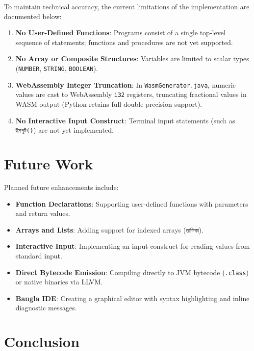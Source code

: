 \documentclass[12pt, a4paper]{report}
\begin{document}
To maintain technical accuracy, the current limitations of the implementation are documented below:
\begin{enumerate}
    \item \textbf{No User-Defined Functions}: Programs consist of a single top-level sequence of statements; functions and procedures are not yet supported.
    \item \textbf{No Array or Composite Structures}: Variables are limited to scalar types (\texttt{NUMBER}, \texttt{STRING}, \texttt{BOOLEAN}).
    \item \textbf{WebAssembly Integer Truncation}: In \texttt{WasmGenerator.java}, numeric values are cast to WebAssembly \texttt{i32} registers, truncating fractional values in WASM output (Python retains full double-precision support).
    \item \textbf{No Interactive Input Construct}: Terminal input statements (such as \texttt{ইনপুট()}) are not yet implemented.
\end{enumerate}

\chapter{Future Work}

Planned future enhancements include:
\begin{itemize}
    \item \textbf{Function Declarations}: Supporting user-defined functions with parameters and return values.
    \item \textbf{Arrays and Lists}: Adding support for indexed arrays (\texttt{তালিকা}).
    \item \textbf{Interactive Input}: Implementing an input construct for reading values from standard input.
    \item \textbf{Direct Bytecode Emission}: Compiling directly to JVM bytecode (\texttt{.class}) or native binaries via LLVM.
    \item \textbf{Bangla IDE}: Creating a graphical editor with syntax highlighting and inline diagnostic messages.
\end{itemize}

\chapter{Conclusion}
\end{document}
